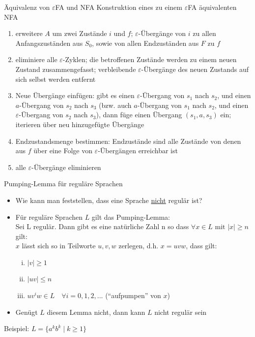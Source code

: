 \begin{frame}{Äquivalenz von $\varepsilon$FA und NFA}
	Konstruktion eines zu einem $\varepsilon$FA äquivalenten NFA
	\begin{enumerate}
		\item erweitere $A$ um zwei Zustände $i$ und $f$; $\varepsilon$-Übergänge von $i$ zu allen Anfangszuständen aus $S_0$, sowie von allen Endzuständen aus $F$ zu $f$
		\item eliminiere alle $\varepsilon$-Zyklen; die betroffenen Zustände werden zu einem neuen Zustand zusammengefasst; verbleibende $\varepsilon$-Übergänge des neuen Zustands auf sich selbst werden entfernt
		\item Neue Übergänge einfügen: gibt es einen $\varepsilon$-Übergang von $s_1$ nach $s_2$, und einen $a$-Übergang von $s_2$ nach $s_3$ (bzw. auch $a$-Übergang von $s_1$ nach $s_2$, und einen $\varepsilon$-Übergang von $s_2$ nach $s_3$), dann füge einen Übergang $(s_1,a,s_3)$ ein; iterieren über neu hinzugefügte Übergänge
		\item Endzustandsmenge bestimmen: Endzustände sind alle Zustände von
		denen aus $f$ über eine Folge von $\varepsilon$-Übergängen erreichbar ist
		\item alle $\varepsilon$-Übergänge eliminieren
	\end{enumerate}
\end{frame}

\begin{frame}{Pumping-Lemma für reguläre Sprachen}
	\begin{itemize}
		\item Wie kann man feststellen, dass eine Sprache \underline{nicht} regulär ist?
		\item Für reguläre Sprachen $L$ gilt das Pumping-Lemma:\\
		Sei L regulär. Dann gibt es eine natürliche Zahl n so dass $\forall x \in L \textrm{ mit } |x|\geq n$ gilt:\\
		$x$ lässt sich so in Teilworte $u, v, w$ zerlegen, d.h. $x=uvw$, dass
		gilt:
		\begin{enumerate} [i.]
			\item $|v| \geq 1$
			\item $|uv| \leq n$
			\item $uv^iw \in L\quad \forall i = 0, 1, 2, ...$ ("`aufpumpen"' von $x$)
		\end{enumerate}
		\item Genügt $L$ diesem Lemma nicht, dann kann $L$ nicht regulär sein
	\end{itemize}
	Beispiel: $L=\{a^kb^k\mid k\geq 1\}$
\end{frame}

